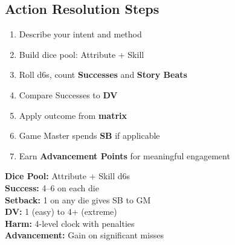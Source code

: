 \begin{multicols}{2}
\section{Action Resolution Steps}

\begin{enumerate}
  \item Describe your intent and method
  \item Build dice pool: Attribute + Skill
  \item Roll d6s, count \textbf{Successes} and \textbf{Story Beats}
  \item Compare Successes to \textbf{DV}
  \item Apply outcome from \textbf{matrix}
  \item Game Master spends \textbf{SB} if applicable
  \item Earn \textbf{Advancement Points} for meaningful engagement
\end{enumerate}

\begin{tcolorbox}[colback=blue!5!white,colframe=blue!75!black,title=Quick Reference,fonttitle=\bfseries]
\textbf{Dice Pool:} Attribute + Skill d6s \\
\textbf{Success:} 4--6 on each die \\
\textbf{Setback:} 1 on any die gives SB to GM \\
\textbf{DV:} 1 (easy) to 4+ (extreme) \\
\textbf{Harm:} 4-level clock with penalties \\
\textbf{Advancement:} Gain on significant misses 
\end{tcolorbox}

\end{multicols}

